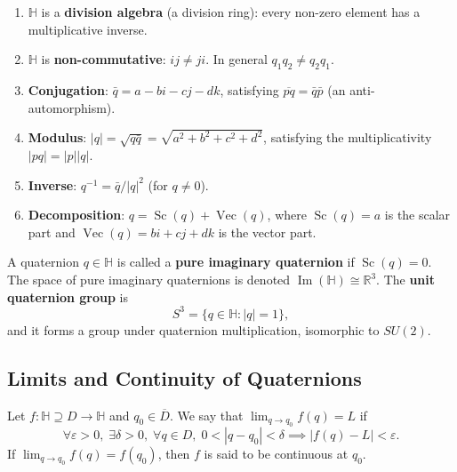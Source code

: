 \begin{property}\label{prop:quaternion_basic_props}
\begin{enumerate}[label=(\roman*)]
    \item $\mathbb{H}$ is a \textbf{division algebra} (a division ring): every non-zero element has a multiplicative inverse.
    \item $\mathbb{H}$ is \textbf{non-commutative}: $ij \neq ji$. In general $q_1 q_2 \neq q_2 q_1$.
    \item \textbf{Conjugation}: $\bar q = a - bi - cj - dk$, satisfying $\overline{pq} = \bar q \bar p$ (an anti-automorphism).
    \item \textbf{Modulus}: $|q| = \sqrt{q\bar q} = \sqrt{a^2 + b^2 + c^2 + d^2}$, satisfying the multiplicativity $|pq| = |p||q|$.
    \item \textbf{Inverse}: $q^{-1} = \bar q/|q|^2$ (for $q \ne 0$).
    \item \textbf{Decomposition}: $q = \operatorname{Sc}(q) + \operatorname{Vec}(q)$, where $\operatorname{Sc}(q) = a$ is the scalar part and $\operatorname{Vec}(q) = bi + cj + dk$ is the vector part.
\end{enumerate}
\end{property}

\begin{definition}\label{def:pure_imaginary}
A quaternion $q \in \mathbb{H}$ is called a \textbf{pure imaginary quaternion} if $\operatorname{Sc}(q) = 0$. The space of pure imaginary quaternions is denoted $\operatorname{Im}(\mathbb{H}) \cong \mathbb{R}^3$. The \textbf{unit quaternion group} is
\[
S^3 = \{q \in \mathbb{H} : |q| = 1\},
\]
and it forms a group under quaternion multiplication, isomorphic to $SU(2)$.
\end{definition}

\subsection{Limits and Continuity of Quaternions}

\begin{definition}\label{def:quaternion_limit}
Let $f: \mathbb{H} \supseteq D \to \mathbb{H}$ and $q_0 \in \overline{D}$. We say that $\lim_{q\to q_0} f(q) = L$ if
\[
\forall \varepsilon > 0,\; \exists \delta > 0,\; \forall q \in D,\; 0 < |q - q_0| < \delta \implies |f(q) - L| < \varepsilon.
\]
If $\lim_{q \to q_0} f(q) = f(q_0)$, then $f$ is said to be continuous at $q_0$.
\end{definition}

